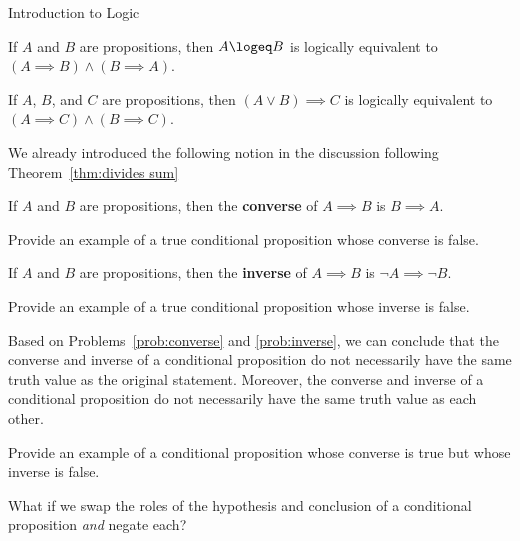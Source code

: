 \begin{section}{Introduction to Logic}
\begin{theorem}\label{thm:logical form for iff}
If $A$ and $B$ are propositions, then $A\logeq B$ is logically equivalent to $(A\implies B)\wedge (B\implies A)$.
\end{theorem}

\begin{theorem}\label{thm:logical form for cases}
If $A$, $B$, and $C$ are propositions, then $(A\vee B)\implies C$ is logically equivalent to $(A\implies C)\wedge (B\implies C)$.
\end{theorem}

We already introduced the following notion in the discussion following Theorem~\ref{thm:divides sum}

\begin{definition}\label{def:converse}
If $A$ and $B$ are propositions, then the \textbf{converse} of $A \implies B$ is $B \implies A$.
\end{definition}

\begin{problem}\label{prob:converse}
Provide an example of a true conditional proposition whose converse is false.
\end{problem}

\begin{definition}\label{def:inverse}
If $A$ and $B$ are propositions, then the \textbf{inverse} of $A \implies B$ is $\neg A \implies \neg B$.
\end{definition}

\begin{problem}\label{prob:inverse}
Provide an example of a true conditional proposition whose inverse is false.
\end{problem}

Based on Problems~\ref{prob:converse} and \ref{prob:inverse}, we can conclude that the converse and inverse of a conditional proposition do not necessarily have the same truth value as the original statement.  Moreover, the converse and inverse of a conditional proposition do not necessarily have the same truth value as each other.

\begin{problem}\label{prob:converse and inverse}
Provide an example of a conditional proposition whose converse is true but whose inverse is false.
\end{problem}

What if we swap the roles of the hypothesis and conclusion of a conditional proposition \emph{and} negate each?


\end{section}
